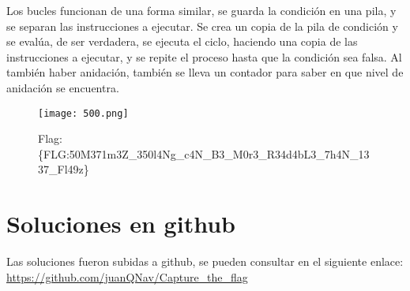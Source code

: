 \documentclass{article}
\begin{document}
Los bucles funcionan de una forma similar, se guarda la condición en una pila, y se separan las instrucciones a ejecutar. Se crea un copia de la pila de condición y se evalúa, de ser verdadera, se ejecuta el ciclo, haciendo una copia de las instrucciones a ejecutar, y se repite el proceso hasta que la condición sea falsa. Al también haber anidación, también se lleva un contador para saber en que nivel de anidación se encuentra.

\begin{figure}[H]
  \centering
  \texttt{[image: 500.png]}
  \caption{Flag: \{FLG:50M371m3Z\_350l4Ng\_c4N\_B3\_M0r3\_R34d4bL3\_7h4N\_1337\_Fl49z\}}
\end{figure}

\section*{Soluciones en github}
Las soluciones fueron subidas a github, se pueden consultar en el siguiente enlace: \url{https://github.com/juanQNav/Capture_the_flag}
\end{document}
